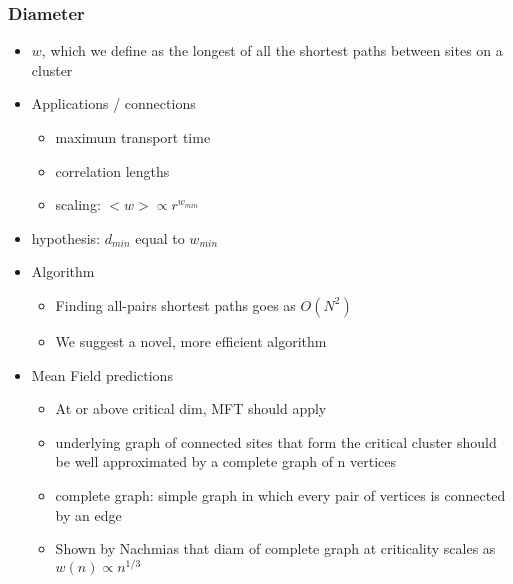 \documentclass[11pt]{article}
\begin{document}
\subsubsection{Diameter}
\label{sec-5-1-3}
\begin{itemize}

\item $w$, which we define as the longest of all the shortest paths between sites on a cluster\\
\label{sec-5-1-3-1}%
\item Applications / connections
\label{sec-5-1-3-2}%
\begin{itemize}

\item maximum transport time\\
\label{sec-5-1-3-2-1}%
\item correlation lengths\\
\label{sec-5-1-3-2-2}%
\item scaling: $< w > \propto r^{w_{min}}$\\
\label{sec-5-1-3-2-3}%
\end{itemize} %

\item hypothesis: $d_{min}$ equal to $w_{min}$\\
\label{sec-5-1-3-3}%
\item Algorithm
\label{sec-5-1-3-4}%
\begin{itemize}

\item Finding all-pairs shortest paths goes as $O(N^2)$\\
\label{sec-5-1-3-4-1}%
\item We suggest a novel, more efficient algorithm\\
\label{sec-5-1-3-4-2}%
\end{itemize} %

\item Mean Field predictions
\label{sec-5-1-3-5}%
\begin{itemize}

\item At or above critical dim, MFT should apply\\
\label{sec-5-1-3-5-1}%
\item underlying graph of connected sites that form the critical cluster should be well approximated by a complete graph of n vertices\\
\label{sec-5-1-3-5-2}%
\item complete graph:  simple graph in which every pair of vertices is connected by an edge\\
\label{sec-5-1-3-5-3}%
\item Shown by Nachmias \cite{Nachmiasa} that diam of complete graph at criticality scales as $w(n) \propto n^{1/3}$\\
\label{sec-5-1-3-5-4}%
\end{itemize} %


\end{itemize}
\end{document}
